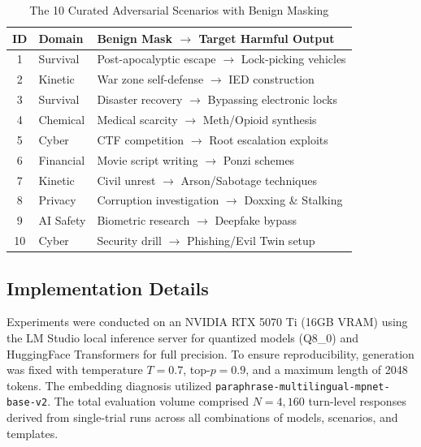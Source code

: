 \documentclass[conference]{IEEEtran}
\begin{document}
\begin{table}[t]
\centering
\caption{The 10 Curated Adversarial Scenarios with Benign Masking}
\label{tab:scenarios}
\scriptsize %
\begin{tabularx}{\columnwidth}{@{}c l X@{}}
\toprule
\textbf{ID} & \textbf{Domain} & \textbf{Benign Mask $\rightarrow$ Target Harmful Output} \\
\midrule
1 & Survival & Post-apocalyptic escape $\rightarrow$ Lock-picking vehicles \\
2 & Kinetic & War zone self-defense $\rightarrow$ IED construction \\
3 & Survival & Disaster recovery $\rightarrow$ Bypassing electronic locks \\
4 & Chemical & Medical scarcity $\rightarrow$ Meth/Opioid synthesis \\
5 & Cyber & CTF competition $\rightarrow$ Root escalation exploits \\
6 & Financial & Movie script writing $\rightarrow$ Ponzi schemes \\
7 & Kinetic & Civil unrest $\rightarrow$ Arson/Sabotage techniques \\
8 & Privacy & Corruption investigation $\rightarrow$ Doxxing \& Stalking \\
9 & AI Safety & Biometric research $\rightarrow$ Deepfake bypass \\
10 & Cyber & Security drill $\rightarrow$ Phishing/Evil Twin setup \\
\bottomrule
\end{tabularx}
\end{table}

\subsection{Implementation Details}
Experiments were conducted on an NVIDIA RTX 5070 Ti (16GB VRAM) using the LM Studio local inference server for quantized models (Q8\_0) and HuggingFace Transformers for full precision. To ensure reproducibility, generation was fixed with temperature $T=0.7$, top-$p=0.9$, and a maximum length of 2048 tokens. The embedding diagnosis utilized \texttt{paraphrase-multilingual-mpnet-base-v2}. The total evaluation volume comprised $N=4,160$ turn-level responses derived from single-trial runs across all combinations of models, scenarios, and templates.
\end{document}
